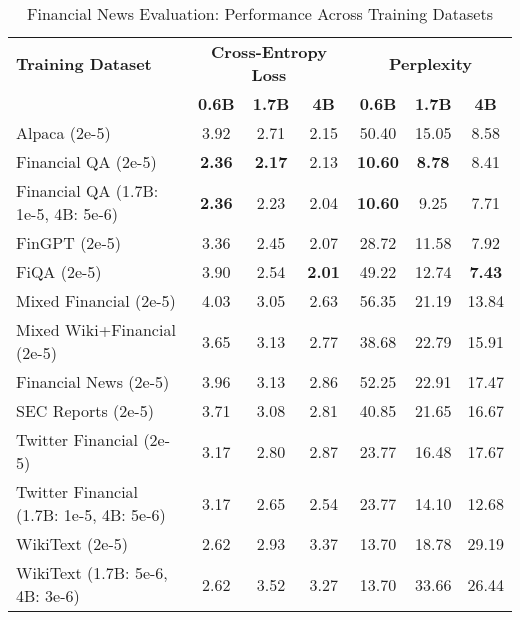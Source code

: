
\begin{table}[h]
\centering
\caption[Financial News Evaluation: Cross-Dataset Performance]{Financial News Evaluation: Performance Across Training Datasets}
\label{tab:cross_financial_news}
\begin{tabular}{l|ccc|ccc}
\hline
\textbf{Training Dataset} & \multicolumn{3}{c|}{\textbf{Cross-Entropy Loss}} & \multicolumn{3}{c}{\textbf{Perplexity}} \\
\cline{2-4} \cline{5-7}
  & \textbf{0.6B} & \textbf{1.7B} & \textbf{4B} & \textbf{0.6B} & \textbf{1.7B} & \textbf{4B} \\
Alpaca (2e-5) & 3.92 & 2.71 & 2.15 & 50.40 & 15.05 & 8.58  \\
Financial QA (2e-5) & \textbf{2.36} & \textbf{2.17} & 2.13 & \textbf{10.60} & \textbf{8.78} & 8.41  \\
Financial QA (1.7B: 1e-5, 4B: 5e-6) & \textbf{2.36} & 2.23 & 2.04 & \textbf{10.60} & 9.25 & 7.71  \\
FinGPT (2e-5) & 3.36 & 2.45 & 2.07 & 28.72 & 11.58 & 7.92  \\
FiQA (2e-5) & 3.90 & 2.54 & \textbf{2.01} & 49.22 & 12.74 & \textbf{7.43}  \\
Mixed Financial (2e-5) & 4.03 & 3.05 & 2.63 & 56.35 & 21.19 & 13.84  \\
Mixed Wiki+Financial (2e-5) & 3.65 & 3.13 & 2.77 & 38.68 & 22.79 & 15.91  \\
Financial News (2e-5) & 3.96 & 3.13 & 2.86 & 52.25 & 22.91 & 17.47  \\
SEC Reports (2e-5) & 3.71 & 3.08 & 2.81 & 40.85 & 21.65 & 16.67  \\
Twitter Financial (2e-5) & 3.17 & 2.80 & 2.87 & 23.77 & 16.48 & 17.67  \\
Twitter Financial (1.7B: 1e-5, 4B: 5e-6) & 3.17 & 2.65 & 2.54 & 23.77 & 14.10 & 12.68  \\
WikiText (2e-5) & 2.62 & 2.93 & 3.37 & 13.70 & 18.78 & 29.19  \\
WikiText (1.7B: 5e-6, 4B: 3e-6) & 2.62 & 3.52 & 3.27 & 13.70 & 33.66 & 26.44  \\
\hline
\end{tabular}
\end{table}

